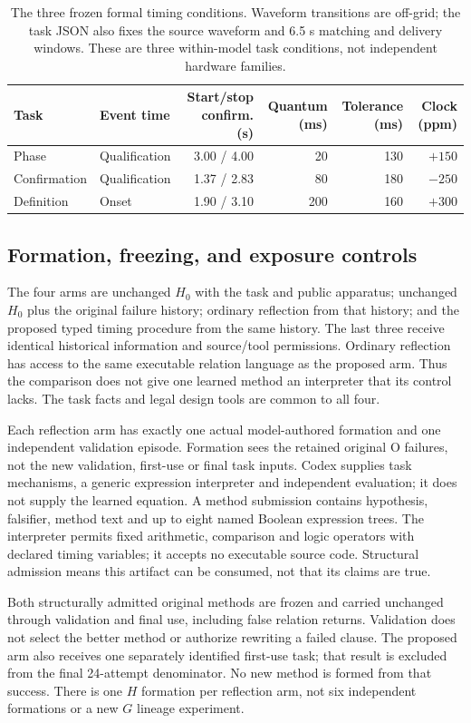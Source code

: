 \begin{table}[htbp]
\centering\small
\begin{tabular}{@{}llrrrr@{}}
\toprule
Task & Event time & Start/stop confirm. (s) & Quantum (ms) & Tolerance (ms) & Clock (ppm) \\
\midrule
Phase & Qualification & 3.00 / 4.00 & 20 & 130 & $+150$ \\
Confirmation & Qualification & 1.37 / 2.83 & 80 & 180 & $-250$ \\
Definition & Onset & 1.90 / 3.10 & 200 & 160 & $+300$ \\
\bottomrule
\end{tabular}
\caption{The three frozen formal timing conditions. Waveform transitions are
off-grid; the task JSON also fixes the source waveform and 6.5 s matching and
delivery windows. These are three within-model task conditions, not independent
hardware families.}\label{tab:ctasks}
\end{table}

\subsection{Formation, freezing, and exposure controls}
The four arms are unchanged $H_0$ with the task and public apparatus; unchanged
$H_0$ plus the original failure history; ordinary reflection from that history;
and the proposed typed timing procedure from the same history. The last three
receive identical historical information and source/tool permissions. Ordinary
reflection has access to the same executable relation language as the proposed
arm. Thus the comparison does not give one learned method an interpreter that
its control lacks. The task facts and legal design tools are common to all four.

Each reflection arm has exactly one actual model-authored formation and one
independent validation episode. Formation sees the retained original O failures,
not the new validation, first-use or final task inputs. Codex supplies task
mechanisms, a generic expression interpreter and independent evaluation; it does
not supply the learned equation. A method submission contains hypothesis,
falsifier, method text and up to eight named Boolean expression trees. The
interpreter permits fixed arithmetic, comparison and logic operators with
declared timing variables; it accepts no executable source code. Structural
admission means this artifact can be consumed, not that its claims are true.

Both structurally admitted original methods are frozen and carried unchanged
through validation and final use, including false relation returns. Validation
does not select the better method or authorize rewriting a failed clause. The
proposed arm also receives one separately identified first-use task; that result
is excluded from the final 24-attempt denominator. No new method is formed from
that success. There is one $H$ formation per reflection arm, not six independent
formations or a new $G$ lineage experiment.

